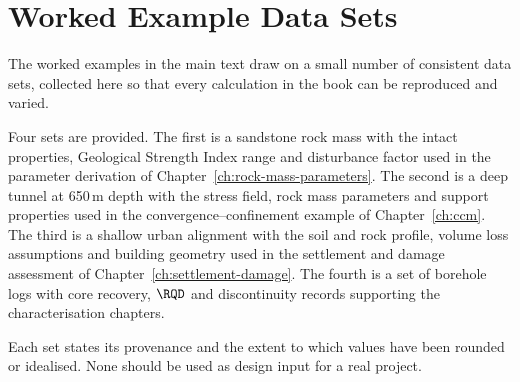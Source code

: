 \chapter{Worked Example Data Sets}
\label{app:datasets}

The worked examples in the main text draw on a small number of consistent data sets, collected here so that every calculation in the book can be reproduced and varied.

Four sets are provided. The first is a sandstone rock mass with the intact properties, Geological Strength Index range and disturbance factor used in the parameter derivation of Chapter~\ref{ch:rock-mass-parameters}. The second is a deep tunnel at 650\,m depth with the stress field, rock mass parameters and support properties used in the convergence--confinement example of Chapter~\ref{ch:ccm}. The third is a shallow urban alignment with the soil and rock profile, volume loss assumptions and building geometry used in the settlement and damage assessment of Chapter~\ref{ch:settlement-damage}. The fourth is a set of borehole logs with core recovery, $\RQD$ and discontinuity records supporting the characterisation chapters.

Each set states its provenance and the extent to which values have been rounded or idealised. None should be used as design input for a real project.
